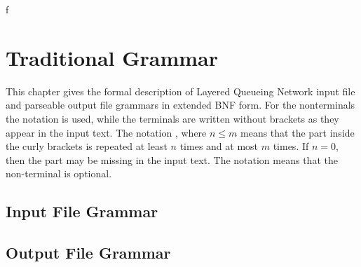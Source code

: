 f%

\chapter{Traditional Grammar}
\label{sec:old-grammar}

This chapter gives the formal description of Layered Queueing Network
input file and parseable output file grammars in extended BNF form.
For the nonterminals the notation  is used, while
the terminals are written without brackets as they appear in the input
text.  The notation , where $n \leq m$ means that
the part inside the curly brackets is repeated at least $n$ times and
at most $m$ times. If $n=0$, then the part may be missing in the input
text. The notation \opt{\nt{$\cdots$}} means that the non-terminal is
optional.

\section{Input File Grammar}
\label{sec:input-file-bnf}



\section{Output File Grammar}
\label{sec:output-file-bnf}



